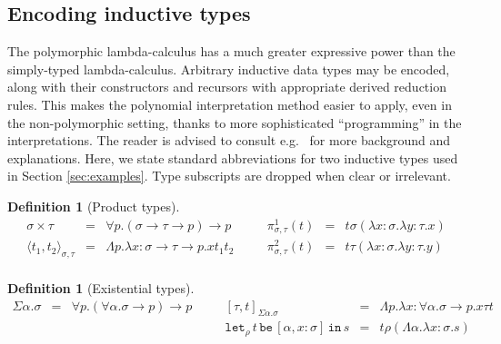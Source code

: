 \documentclass[a4paper,UKenglish,cleveref,autoref,numberwithinsect]{lipics-v2019}
\theoremstyle{definition}
\newtheorem{defn}[theorem]{Definition}
\newcommand{\arrtype}{\rightarrow}
\newcommand{\abs}[2]{\lambda #1.#2}
\newcommand{\tabs}[2]{\Lambda #1.#2}
\newcommand{\pair}[2]{\langle #1,#2 \rangle}
\newcommand{\expair}[2]{[#1,#2]}
\newcommand{\List}{\mathtt{List}}
\newcommand{\nil}{\mathtt{nil}}
\newcommand{\cons}{\mathtt{cons}}
\newcommand{\fold}{\mathtt{fold}}
\newcommand{\xlet}[4]{\mathtt{let}_{#1}\,#2\,\mathtt{be}\,[#3]\,\mathtt{in}\,#4}
\begin{document}
\subsection{Encoding inductive types}\label{sec_encodings}

The polymorphic lambda-calculus has a much greater expressive power
than the simply-typed lambda-calculus. Arbitrary inductive data types
may be encoded, along with their constructors and recursors with
appropriate derived reduction rules. This makes the polynomial
interpretation method easier to apply, even in the non-polymorphic
setting, thanks to more sophisticated ``programming'' in the
interpretations.
%
The reader is advised to consult e.g.~\cite[Chapter~11]{Girard1989}
for more background and explanations. Here, we state standard
abbreviations for two inductive types used in Section
\ref{sec:examples}. Type subscripts are dropped when clear
or irrelevant.

\begin{defn}[Product types]
  \[
  \begin{array}{rclcrcl}
    \sigma \times \tau &=& \forall p . (\sigma \arrtype \tau \arrtype p) \arrtype p & \quad &
    \pi^1_{\sigma,\tau}(t) &=& t \sigma (\abs{x:\sigma}{\abs{y:\tau}{x}}) \\
    \pair{t_1}{t_2}_{\sigma,\tau} &=& \tabs{p}{\abs{x:\sigma\arrtype\tau\arrtype p}{x t_1 t_2}} & &
    \pi^2_{\sigma,\tau}(t) &=& t \tau (\abs{x:\sigma}{\abs{y:\tau}{y}}) \\
  \end{array}
  \]
\end{defn}

\begin{defn}[Existential types]
  \[
  \begin{array}{rclcrcl}
    \Sigma \alpha . \sigma &=& \forall p . (\forall \alpha . \sigma \arrtype p) \arrtype p & \quad &
    \expair{\tau}{t}_{\Sigma\alpha.\sigma} &=& \tabs{p}{\abs{x:\forall\alpha.\sigma\arrtype p}{x \tau t}} \\
    & & & &
    \xlet{\rho}{t}{\alpha,x:\sigma}{s} &=& t \rho (\tabs{\alpha}{\abs{x:\sigma}{s}}) \\
  \end{array}
  \]
\end{defn}

\end{document}

